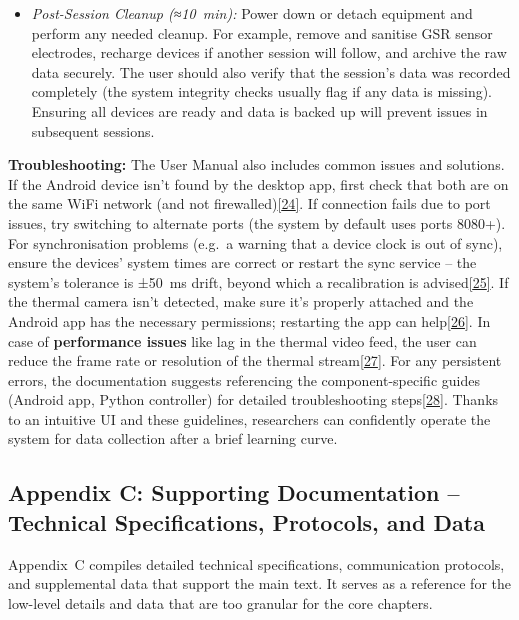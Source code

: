 \documentclass[12pt,a4paper]{article}
\begin{document}
\begin{itemize}
\item
  \emph{Post-Session Cleanup (≈10~min):} Power down or detach equipment and perform any needed cleanup. For example, remove and sanitise GSR sensor electrodes, recharge devices if another session will follow, and archive the raw data securely. The user should also verify that the session's data was recorded completely (the system integrity checks usually flag if any data is missing). Ensuring all devices are ready and data is backed up will prevent issues in subsequent sessions.
\end{itemize}

\textbf{Troubleshooting:} The User Manual also includes common issues and solutions. If the Android device isn't found by the desktop app, first check that both are on the same WiFi network (and not firewalled)\href{docs/QUICK_START.md\#L66-L74}{{[}24{]}}. If connection fails due to port issues, try switching to alternate ports (the system by default uses ports 8080+). For synchronisation problems (e.g.~a warning that a device clock is out of sync), ensure the devices' system times are correct or restart the sync service -- the system's tolerance is ±50~ms drift, beyond which a recalibration is advised\href{docs/thesis_report/Chapter_7_Appendices.md\#L60-L64}{{[}25{]}}. If the thermal camera isn't detected, make sure it's properly attached and the Android app has the necessary permissions; restarting the app can help\href{docs/QUICK_START.md\#L70-L75}{{[}26{]}}. In case of \textbf{performance issues} like lag in the thermal video feed, the user can reduce the frame rate or resolution of the thermal stream\href{docs/QUICK_START.md\#L76-L79}{{[}27{]}}. For any persistent errors, the documentation suggests referencing the component-specific guides (Android app, Python controller) for detailed troubleshooting steps\href{docs/QUICK_START.md\#L90-L94}{{[}28{]}}. Thanks to an intuitive UI and these guidelines, researchers can confidently operate the system for data collection after a brief learning curve.

\subsection{Appendix C: Supporting Documentation -- Technical Specifications, Protocols, and Data}\label{appendix-c-supporting-documentation-technical-specifications-protocols-and-data}

Appendix~C compiles detailed technical specifications, communication protocols, and supplemental data that support the main text. It serves as a reference for the low-level details and data that are too granular for the core chapters.
\end{document}
